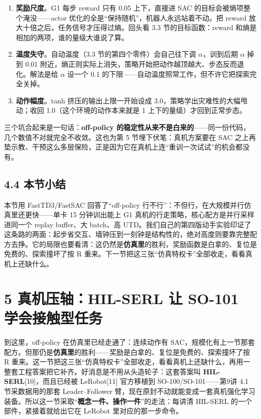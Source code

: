 \documentclass[
  chinese,
]{ctexart}
\providecommand{\tightlist}{%
  \setlength{\itemsep}{0pt}\setlength{\parskip}{0pt}}
\begin{document}
\begin{enumerate}
\def\labelenumi{\arabic{enumi}.}
\tightlist
\item
  \textbf{奖励尺度}。G1 每步 reward 只有 0.05 上下，直接进 SAC
  的目标会被熵项整个淹没------actor
  优化的全是``保持随机''，机器人永远站着不动。把 reward
  放大十倍之后，任务信号才压得过熵。回头看 3.3 节的目标函数：reward
  和熵是相加的两项，谁的量级大谁说了算。
\item
  \textbf{温度失守}。自动温度（3.3 节的第四个零件）会自己往下调
  \(\alpha\)，训到后期 \(\alpha\) 掉到 0.01
  附近，熵正则实际上消失，策略开始把动作越顶越大、步态反而退化。解法是给
  \(\alpha\) 设一个 0.1
  的下限------自动温度照常工作，但不许它把探索完全关掉。
\item
  \textbf{动作幅度}。tanh 挤压的输出上限一开始设成
  3.0，策略学出灾难性的大幅甩动；收回 1.0（这个环境的动作本来就是 1
  上下的量级）才回到正常步态。
\end{enumerate}

三个坑合起来是一句话：\textbf{off-policy
的稳定性从来不是白来的}------同一份代码，几个数值不对就完全不收敛。这也为第
5 节埋下伏笔：真机方案要在 SAC
之上再垫示教、干预这么多层保险，正是因为它在真机上连``重训一次试试''的机会都没有。

\subsection{4.4 本节小结}\label{ux672cux8282ux5c0fux7ed3-3}

本节用 FastTD3/FastSAC 回答了``off-policy
行不行''：不但行，在大规模并行仿真里还更快------单卡 15 分钟训出能上 G1
真机的行走策略，核心配方是并行采样进同一个 replay buffer、大 batch、高
UTD。我们自己的第四版动手实验印证了这条路的两面：起步省交互、墙钟压到一刻钟是结构性的，绝对高度则要靠完整配方去挣。它的局限也要看清：这仍然是\textbf{仿真里}的胜利，奖励函数是白拿的、复位是免费的、探索撞坏了按
R 重来。下一节把这三张``仿真特权卡''全部收走，看看真机上还缺什么。

\section{5 真机压轴：HIL-SERL 让 SO-101
学会接触型任务}\label{ux771fux673aux538bux8f74hil-serl-ux8ba9-so-101-ux5b66ux4f1aux63a5ux89e6ux578bux4efbux52a1}

到这里，off-policy 在仿真里已经走通了：连续动作有
SAC，规模化有上一节那套配方。但那仍是\textbf{仿真里}的胜利------奖励是白拿的、复位是免费的、探索撞坏了按
R
重来。这一节把这三张``仿真特权卡''全部收走，看看真机上还缺什么，再用一整套工程答案把它补齐。好消息是不用从头造轮子：这套答案叫
\textbf{HIL-SERL}{[}10{]}，而且已经被 LeRobot{[}11{]} 官方移植到
SO-100/SO-101------第9讲 4.1 节采数据用的那套 Leader--Follower
臂，现在原封不动就能变成一套真机强化学习装备。所以这一节采取``\textbf{概念一件、操作一件}''的走法：每讲清
HIL-SERL 的一个部件，紧接着就给出它在 LeRobot 里对应的那一步命令。
\end{document}
